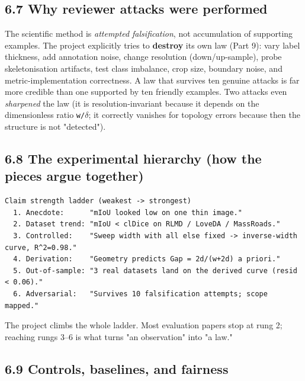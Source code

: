 \documentclass[11pt]{article}
\begin{document}
\subsection*{6.7 Why reviewer attacks were performed}

The scientific method is \textit{attempted falsification}, not accumulation of supporting examples. The project explicitly tries to \textbf{destroy} its own law (Part 9): vary label thickness, add annotation noise, change resolution (down/up-sample), probe skeletonisation artifacts, test class imbalance, crop size, boundary noise, and metric-implementation correctness. A law that survives ten genuine attacks is far more credible than one supported by ten friendly examples. Two attacks even \textit{sharpened} the law (it is resolution-invariant because it depends on the dimensionless ratio \texttt{w/$\delta$}; it correctly vanishes for topology errors because then the structure is not "detected").

\subsection*{6.8 The experimental hierarchy (how the pieces argue together)}

\begin{Verbatim}[breaklines=true,breakanywhere=true,fontsize=\footnotesize]
  Claim strength ladder (weakest -> strongest)
  1. Anecdote:      "mIoU looked low on one thin image."
  2. Dataset trend: "mIoU < clDice on RLMD / LoveDA / MassRoads."
  3. Controlled:    "Sweep width with all else fixed -> inverse-width curve, R^2=0.98."
  4. Derivation:    "Geometry predicts Gap = 2d/(w+2d) a priori."
  5. Out-of-sample: "3 real datasets land on the derived curve (resid < 0.06)."
  6. Adversarial:   "Survives 10 falsification attempts; scope mapped."
\end{Verbatim}

The project climbs the whole ladder. Most evaluation papers stop at rung 2; reaching rungs 3--6 is what turns "an observation" into "a law."

\subsection*{6.9 Controls, baselines, and fairness}
\end{document}
